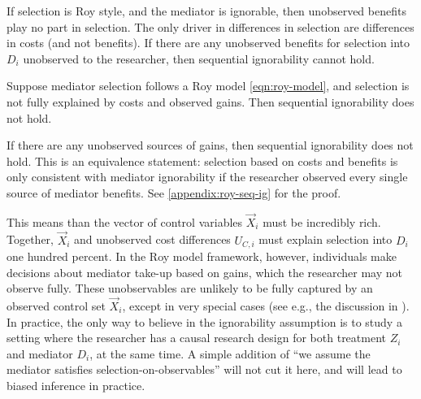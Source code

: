 If selection is Roy style, and the mediator is ignorable, then unobserved benefits play no part in selection.
The only driver in differences in selection are differences in costs (and not benefits).
If there are any unobserved benefits for selection into $D_i$ unobserved to the researcher, then sequential ignorability cannot hold.
\begin{definition}
    \label{def:roy-seq-ig}
    Suppose mediator selection follows a Roy model \eqref{eqn:roy-model}, and selection is not fully explained by costs and observed gains.
    Then sequential ignorability does not hold.
\end{definition}
If there are any unobserved sources of gains, then sequential ignorability does not hold.
This is an equivalence statement: selection based on costs and benefits is only consistent with mediator ignorability if the researcher observed every single source of mediator benefits.
See \autoref{appendix:roy-seq-ig} for the proof.

This means than the vector of control variables $\vec X_i$ must be incredibly rich.
Together, $\vec X_i$ and unobserved cost differences $U_{C,i}$ must explain selection into $D_i$ one hundred percent.
In the Roy model framework, however, individuals make decisions about mediator take-up based on gains, which the researcher may not observe fully. 
These unobservables are unlikely to be fully captured by an observed control set $\vec X_i$, except in very special cases (see e.g., the discussion in \citealt{angrist2009mostly,angrist2022empirical}).
In practice, the only way to believe in the ignorability assumption is to study a setting where the researcher has a causal research design for both treatment $Z_i$ and mediator $D_i$, at the same time.
A simple addition of ``we assume the mediator satisfies selection-on-observables'' will not cut it here, and will lead to biased inference in practice.

% 
% 
% 
